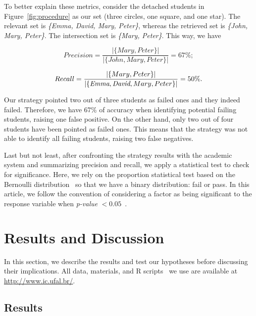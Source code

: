 To better explain these metrics, consider the detached students in Figure~\ref{fig:procedure} as our set (three circles, one square, and one star). The relevant set is \textit{\{Emma, David, Mary, Peter\}}, whereas the retrieved set is \textit{\{John, Mary, Peter\}}. The intersection set is \textit{\{Mary, Peter\}}. This way, we have

\vspace{0.2cm}
\noindent
\scriptsize
\begin{minipage}{.5\linewidth}
\centering
$$
Precision = \frac{|\{Mary, Peter\}|}{|\{John, Mary, Peter\}|} = 67\%;
$$
\end{minipage}
\begin{minipage}{.5\linewidth}
$$
Recall = \frac{|\{Mary, Peter\}|}{|\{\textit{\text{Emma}}, \textit{\text{David}}, Mary, Peter\}|} = 50\%.
$$
\end{minipage}
\normalsize
\vspace{0.2cm}

Our strategy pointed two out of three students as failed ones and they indeed failed. Therefore, we have 67\% of accuracy when identifying potential failing students, raising one false positive. On the other hand, only two out of four students have been pointed as failed ones. This means that the strategy was not able to identify all failing students, raising two false negatives.

Last but not least, after confronting the strategy results with the academic system and summarizing precision and recall, we apply a statistical test to check for significance. Here, we rely on the proportion statistical test based on the Bernoulli distribution~\cite{linear-models-1989} so that we have a binary distribution: fail or pass. In this article, we follow the convention of considering a factor as being significant to the response variable when \textit{p-value} $< 0.05$~\cite{box-statistics-for-experimenters}.

\section{Results and Discussion}

\label{sec:results}

In this section, we describe the results and test our hypotheses before discussing their implications. All data, materials, and R scripts~\cite{r-statistical} we use are available at \url{http://www.ic.ufal.br/}.

\subsection{Results}

